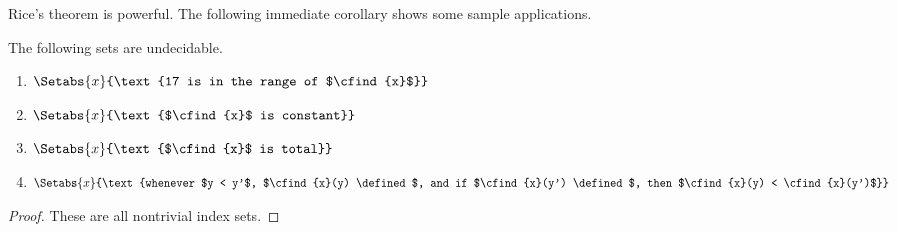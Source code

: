 \documentclass[../../include/open-logic-section]{subfiles}
\begin{document}
Rice's theorem is powerful. The following immediate corollary
shows some sample applications.
\begin{cor}
The following sets are undecidable.
\begin{enumerate}
\item $\Setabs{x}{\text{17 is in the range of $\cfind{x}$}}$
\item $\Setabs{x}{\text{$\cfind{x}$ is constant}}$
\item $\Setabs{x}{\text{$\cfind{x}$ is total}}$
\item $\Setabs{x}{\text{whenever $y < y'$, $\cfind{x}(y) \defined$, and
    if $\cfind{x}(y') \defined$, then $\cfind{x}(y) < \cfind{x}(y')$}}$
\end{enumerate}
\end{cor}

\begin{proof}These are all nontrivial index sets. \end{proof}
\end{document}
